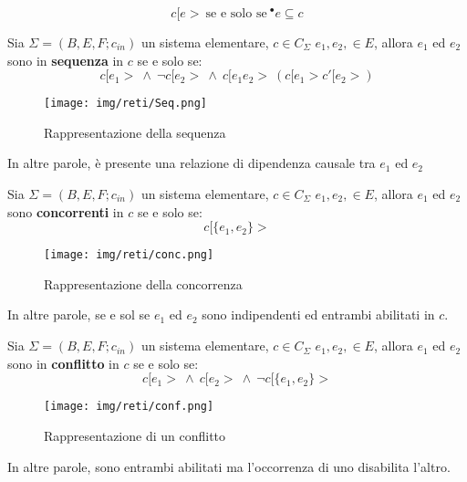 \begin{equation}
    c[e> \ \text{se e solo se} \ ^{\bullet} e \subseteq c
\end{equation}
\begin{definizione}
    Sia $\Sigma = (B, E, F; c_{in})$ un sistema elementare, $c \in C_{\Sigma}$ $e_1, e_2, \in E$, allora $e_1$ ed $e_2$ sono in \textbf{sequenza} in $c$ se e solo se:
    \begin{equation}
        c[e_1 > \ \land \ \lnot c[e_2 > \ \land \ c[e_1e_2 > \ (c[e_1 > c'[e_2 >)
    \end{equation}
    \begin{figure}[!ht]
        \centering
        \texttt{[image: img/reti/Seq.png]}
        \caption{Rappresentazione della sequenza}
    \end{figure}
    In altre parole, è presente una relazione di dipendenza causale tra $e_1$ ed $e_2$
\end{definizione}
\begin{definizione}
    Sia $\Sigma = (B, E, F; c_{in})$ un sistema elementare, $c \in C_{\Sigma}$ $e_1, e_2, \in E$, allora $e_1$ ed $e_2$ sono \textbf{concorrenti} in $c$ se e solo se:
    \begin{equation}
        c[\{e_1, e_2\} >
    \end{equation}
    \begin{figure}[!ht]
        \centering
        \texttt{[image: img/reti/conc.png]}
        \caption{Rappresentazione della concorrenza}
    \end{figure}
    In altre parole, se e sol se $e_1$ ed $e_2$ sono indipendenti ed entrambi abilitati in $c$.
\end{definizione}
\begin{definizione}
    Sia $\Sigma = (B, E, F; c_{in})$ un sistema elementare, $c \in C_{\Sigma}$ $e_1, e_2, \in E$, allora $e_1$ ed $e_2$ sono in \textbf{conflitto} in $c$ se e solo se:
    \begin{equation}
        c[e_1 > \ \land \ c[e_2 > \ \land \ \lnot c[\{e_1, e_2\} >
    \end{equation}
        \begin{figure}[!ht]
        \centering
        \texttt{[image: img/reti/conf.png]}
        \caption{Rappresentazione di un conflitto}
    \end{figure}
    In altre parole, sono entrambi abilitati ma l'occorrenza di uno disabilita l'altro.
\end{definizione}
